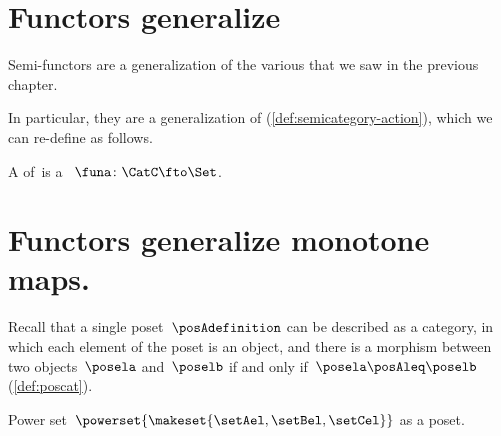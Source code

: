 
\section[\dots as \SY{semicategory actions}]{Functors generalize }


Semi-functors are a generalization of the various  that we saw in the previous chapter.


In particular, they are a generalization of  (\cref{def:semicategory-action}), which we can re-define as follows.

\begin{ctdefinition}\label{def:semicat-action-redefined}
    A  of~\CatC is a ~$\funa\colon \CatC \fto \Set$.
\end{ctdefinition}

\section[\dots as  monotone maps]{Functors generalize monotone maps.}
\label{sec:posetsarecats}


Recall that a single poset~$\posAdefinition$ can be described as a category, in which each element of the poset is an object, and there is a morphism between two objects~$\posela$ and~$\poselb$ if and only if~$\posela \posAleq \poselb$ (\cref{def:poscat}).



\begin{marginfigure}
    \centering
    \caption{Power set~$\powerset{\makeset{\setAel,\setBel,\setCel}}$ as a poset. \label{fig:posetascat}}
\end{marginfigure}

